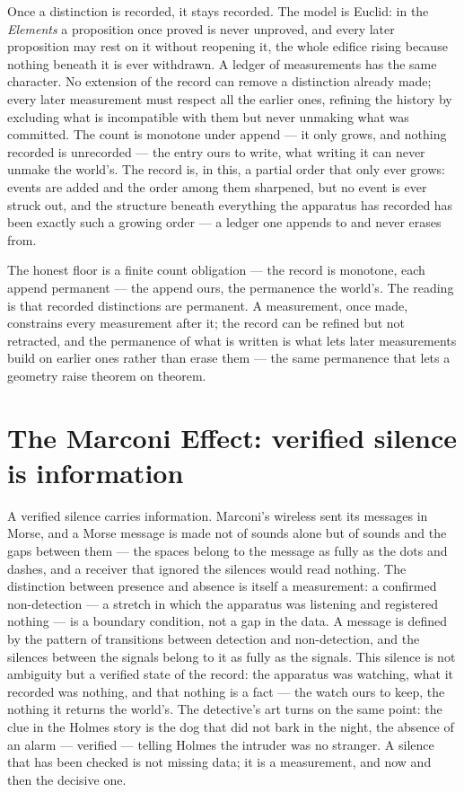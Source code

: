 Once a distinction is recorded, it stays recorded. The model is Euclid: in the \emph{Elements} a proposition
once proved is never unproved, and every later proposition may rest on it without reopening it, the whole
edifice rising because nothing beneath it is ever withdrawn. A ledger of measurements has the same character.
No extension of the record can remove a distinction already made; every later measurement must respect all the
earlier ones, refining the history by excluding what is incompatible with them but never unmaking what was
committed. The count is monotone under append --- it only grows, and nothing recorded is unrecorded --- the
entry ours to write, what writing it can never unmake the world's. The
record is, in this, a partial order that only ever grows: events are added and the order among them sharpened,
but no event is ever struck out, and the structure beneath everything the apparatus has recorded has been
exactly such a growing order --- a ledger one appends to and never erases from.

The honest floor is a finite count obligation --- the record is monotone, each append permanent --- the append
ours, the permanence the world's. The reading is
that recorded distinctions are permanent. A measurement, once made, constrains every measurement after it; the
record can be refined but not retracted, and the permanence of what is written is what lets later measurements
build on earlier ones rather than erase them --- the same permanence that lets a geometry raise theorem on
theorem.

\section{The Marconi Effect: verified silence is information}
\label{se:marconi}

A verified silence carries information. Marconi's wireless sent its messages in Morse, and a Morse message is
made not of sounds alone but of sounds and the gaps between them --- the spaces belong to the message as fully
as the dots and dashes, and a receiver that ignored the silences would read nothing. The distinction between
presence and absence is itself a measurement: a confirmed non-detection --- a stretch in which the apparatus
was listening and registered nothing --- is a boundary condition, not a gap in the data. A message is defined
by the pattern of transitions between detection and non-detection, and the silences between the signals belong
to it as fully as the signals. This silence is not ambiguity but a verified state of the record: the apparatus
was watching, what it recorded was nothing, and that nothing is a fact --- the watch ours to keep, the nothing
it returns the world's. The detective's art turns on the same
point: the clue in the Holmes story is the dog that did not bark in the night, the absence of an alarm ---
verified --- telling Holmes the intruder was no stranger. A silence that has been checked is not missing data;
it is a measurement, and now and then the decisive one.

